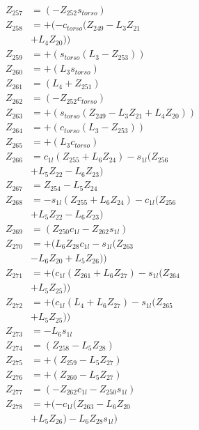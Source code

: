 \begin{multicols}{2}
\begin{align}
Z_{257} &= (-Z_{252}s_{torso}) \nonumber \\
Z_{258} &= + (-c_{torso}(Z_{249} - L_3Z_{21}  \nonumber \\
&+ L_4Z_{20})) \nonumber \\
Z_{259} &= + (s_{torso}(L_3 - Z_{253})) \nonumber \\
Z_{260} &= + (L_3s_{torso}) \nonumber \\
Z_{261} &= (L_4 + Z_{251}) \nonumber \\
Z_{262} &= (-Z_{252}c_{torso}) \nonumber \\
Z_{263} &= + (s_{torso}(Z_{249} - L_3Z_{21} + L_4Z_{20})) \nonumber \\
Z_{264} &= + (c_{torso}(L_3 - Z_{253})) \nonumber \\
Z_{265} &= + (L_3c_{torso}) \nonumber \\
Z_{266} &=   c_{1l}(Z_{255} + L_6Z_{24}) - s_{1l}(Z_{256}  \nonumber \\
&+ L_5Z_{22} - L_6Z_{23}) \nonumber \\
Z_{267} &=                                                    Z_{254} - L_5Z_{24} \nonumber \\
Z_{268} &= - s_{1l}(Z_{255} + L_6Z_{24}) - c_{1l}(Z_{256}  \nonumber \\
&+ L_5Z_{22} - L_6Z_{23}) \nonumber \\
Z_{269} &=  (Z_{250}c_{1l} - Z_{262}s_{1l}) \nonumber \\
Z_{270} &= + (L_6Z_{28}c_{1l} - s_{1l}(Z_{263}  \nonumber \\
&- L_6Z_{20} + L_5Z_{26})) \nonumber \\
Z_{271} &= + (c_{1l}(Z_{261} + L_6Z_{27}) - s_{1l}(Z_{264}  \nonumber \\
&+ L_5Z_{25})) \nonumber \\
Z_{272} &= + (c_{1l}(L_4 + L_6Z_{27}) - s_{1l}(Z_{265}  \nonumber \\
&+ L_5Z_{25})) \nonumber \\
Z_{273} &= - L_6s_{1l} \nonumber \\
Z_{274} &= (Z_{258} - L_5Z_{28}) \nonumber \\
Z_{275} &= + (Z_{259} - L_5Z_{27}) \nonumber \\
Z_{276} &= + (Z_{260} - L_5Z_{27}) \nonumber \\
Z_{277} &= (- Z_{262}c_{1l} - Z_{250}s_{1l}) \nonumber \\
Z_{278} &= + (- c_{1l}(Z_{263} - L_6Z_{20}  \nonumber \\
&+ L_5Z_{26}) - L_6Z_{28}s_{1l}) \nonumber \\

\end{align}
\end{multicols}
